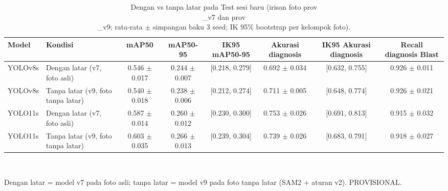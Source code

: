 \begin{table}[!t]
\centering
\caption{Dengan vs tanpa latar pada Test sesi baru (irisan foto prov\\_v7 dan prov\\_v9; rata-rata $\pm$ simpangan baku 3 seed; IK 95\% bootstrap per kelompok foto).}
\label{tab:v9_2x2_test_new_session}
\footnotesize
\setlength{\tabcolsep}{3pt}
\begin{tabular}{llcccccc}
\hline
\textbf{Model} & \textbf{Kondisi} & \textbf{mAP50} & \textbf{mAP50-95} & \textbf{IK95 mAP50-95} & \textbf{Akurasi diagnosis} & \textbf{IK95 Akurasi diagnosis} & \textbf{Recall diagnosis Blast} \\
\hline
YOLOv8s & Dengan latar (v7, foto asli) & 0.546 $\pm$ 0.017 & 0.244 $\pm$ 0.007 & [0.218, 0.279] & 0.692 $\pm$ 0.034 & [0.632, 0.755] & 0.926 $\pm$ 0.011 \\
YOLOv8s & Tanpa latar (v9, foto tanpa latar) & 0.540 $\pm$ 0.018 & 0.238 $\pm$ 0.006 & [0.212, 0.274] & 0.711 $\pm$ 0.005 & [0.648, 0.774] & 0.926 $\pm$ 0.021 \\
YOLO11s & Dengan latar (v7, foto asli) & 0.587 $\pm$ 0.014 & 0.260 $\pm$ 0.012 & [0.230, 0.300] & 0.753 $\pm$ 0.026 & [0.691, 0.813] & 0.915 $\pm$ 0.032 \\
YOLO11s & Tanpa latar (v9, foto tanpa latar) & 0.603 $\pm$ 0.035 & 0.266 $\pm$ 0.013 & [0.239, 0.304] & 0.739 $\pm$ 0.026 & [0.683, 0.791] & 0.918 $\pm$ 0.027 \\
\hline
\end{tabular}
\\[2pt]\parbox{\columnwidth}{\scriptsize Dengan latar = model v7 pada foto asli; tanpa latar = model v9 pada foto tanpa latar (SAM2 + aturan v2). PROVISIONAL.}
\end{table}
